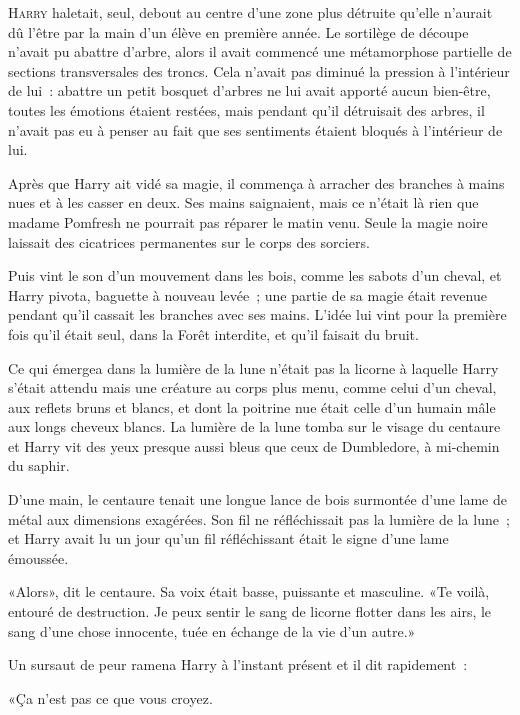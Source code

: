
\lettrine{H}{arry} haletait, seul, debout au centre d'une zone plus détruite qu'elle n'aurait dû l'être par la main d'un élève en première année. Le sortilège de découpe n'avait pu abattre d'arbre, alors il avait commencé une métamorphose partielle de sections transversales des troncs. Cela n'avait pas diminué la pression à l'intérieur de lui~: abattre un petit bosquet d'arbres ne lui avait apporté aucun bien-être, toutes les émotions étaient restées, mais pendant qu'il détruisait des arbres, il n'avait pas eu à penser au fait que ses sentiments étaient bloqués à l'intérieur de lui.

Après que Harry ait vidé sa magie, il commença à arracher des branches à mains nues et à les casser en deux. Ses mains saignaient, mais ce n'était là rien que madame Pomfresh ne pourrait pas réparer le matin venu. Seule la magie noire laissait des cicatrices permanentes sur le corps des sorciers.

Puis vint le son d'un mouvement dans les bois, comme les sabots d'un cheval, et Harry pivota, baguette à nouveau levée~; une partie de sa magie était revenue pendant qu'il cassait les branches avec ses mains. L'idée lui vint pour la première fois qu'il était seul, dans la Forêt interdite, et qu'il faisait du bruit.

Ce qui émergea dans la lumière de la lune n'était pas la licorne à laquelle Harry s'était attendu mais une créature au corps plus menu, comme celui d'un cheval, aux reflets bruns et blancs, et dont la poitrine nue était celle d'un humain mâle aux longs cheveux blancs. La lumière de la lune tomba sur le visage du centaure et Harry vit des yeux presque aussi bleus que ceux de Dumbledore, à mi-chemin du saphir.

D'une main, le centaure tenait une longue lance de bois surmontée d'une lame de métal aux dimensions exagérées. Son fil ne réfléchissait pas la lumière de la lune~; et Harry avait lu un jour qu'un fil réfléchissant était le signe d'une lame émoussée.

«Alors», dit le centaure. Sa voix était basse, puissante et masculine. «Te voilà, entouré de destruction. Je peux sentir le sang de licorne flotter dans les airs, le sang d'une chose innocente, tuée en échange de la vie d'un autre.»

Un sursaut de peur ramena Harry à l'instant présent et il dit rapidement~:

«Ça n'est pas ce que vous croyez.

